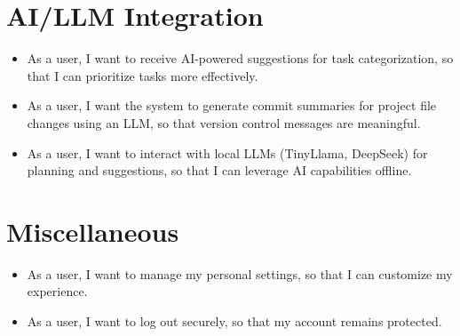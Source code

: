 \documentclass{article}
\begin{document}
\section{AI/LLM Integration}
\begin{itemize}[leftmargin=*, label=--]
    \item As a user, I want to receive AI-powered suggestions for task categorization, so that I can prioritize tasks more effectively.
    \item As a user, I want the system to generate commit summaries for project file changes using an LLM, so that version control messages are meaningful.
    \item As a user, I want to interact with local LLMs (TinyLlama, DeepSeek) for planning and suggestions, so that I can leverage AI capabilities offline.
\end{itemize}

\section{Miscellaneous}
\begin{itemize}[leftmargin=*, label=--]
    \item As a user, I want to manage my personal settings, so that I can customize my experience.
    \item As a user, I want to log out securely, so that my account remains protected.
\end{itemize}
\end{document}
